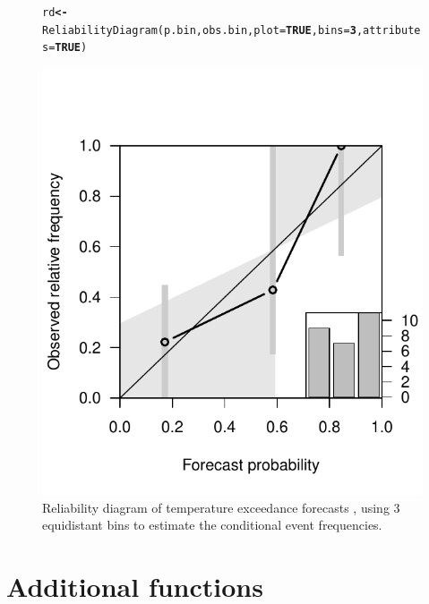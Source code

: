 \documentclass[article]{jss}\usepackage[]{graphicx}\usepackage[]{color}
\makeatletter
\def\maxwidth{ %
  \ifdim\Gin@nat@width>\linewidth
    \linewidth
  \else
    \Gin@nat@width
  \fi
}
\newcommand{\hlnum}[1]{\textcolor[rgb]{0.502,0,0.502}{\textbf{#1}}}%
\newcommand{\hlstd}[1]{\textcolor[rgb]{0,0,0}{#1}}%
\newcommand{\hlkwb}[1]{\textcolor[rgb]{0.502,0.502,0.753}{\textbf{#1}}}%
\newcommand{\hlkwc}[1]{\textcolor[rgb]{0,0.502,0.753}{#1}}%
\newcommand{\hlkwd}[1]{\textcolor[rgb]{0,0.267,0.4}{#1}}%
\newenvironment{kframe}{%
 \def\at@end@of@kframe{}%
 \ifinner\ifhmode%
  \def\at@end@of@kframe{\end{minipage}}%
  \begin{minipage}{\columnwidth}%
 \fi\fi%
 \def\FrameCommand##1{\hskip\@totalleftmargin \hskip-\fboxsep
 \colorbox{shadecolor}{##1}\hskip-\fboxsep
     \hskip-\linewidth \hskip-\@totalleftmargin \hskip\columnwidth}%
 \MakeFramed {\advance\hsize-\width
   \@totalleftmargin\z@ \linewidth\hsize
   \@setminipage}}%
 {\par\unskip\endMakeFramed%
 \at@end@of@kframe}
\newenvironment{knitrout}{}{} %
\makeatother
\begin{document}
\begin{figure}
\begin{center}
%
\begin{knitrout}
\color{fgcolor}\begin{kframe}
\begin{alltt}
\hlstd{rd} \hlkwb{<-} \hlkwd{ReliabilityDiagram}\hlstd{(p.bin, obs.bin,} \hlkwc{plot}\hlstd{=}\hlnum{TRUE}\hlstd{,} \hlkwc{bins}\hlstd{=}\hlnum{3}\hlstd{,} \hlkwc{attributes}\hlstd{=}\hlnum{TRUE}\hlstd{)}
\end{alltt}
\end{kframe}
\includegraphics[width=\maxwidth]{figure/reldiag-1} 

\end{knitrout}
%
\end{center}
\caption{Reliability diagram of temperature exceedance forecasts , using 3 equidistant bins to estimate the conditional event frequencies.} 
\label{reldiag-plot}
\end{figure}


\section{Additional functions}
\end{document}
